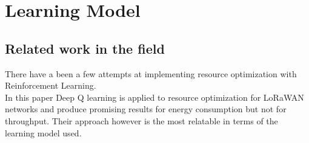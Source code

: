 
\chapter{Learning Model}



\section{Related work in the field}

There have a been a few attempts at implementing resource 
optimization with Reinforcement Learning. \\

In this paper \cite{rl_lora_original} Deep Q learning is applied
to resource optimization for LoRaWAN networks and produce
promising results for energy consumption but not for throughput. Their approach however is the most relatable in terms of 
the learning model used.\\


